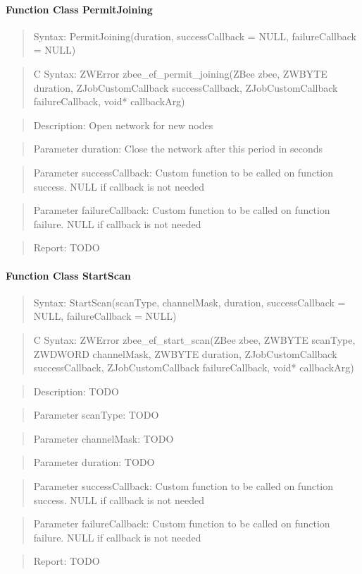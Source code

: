 \paragraph{Function Class PermitJoining}
\begin{quote}Syntax: PermitJoining(duration, successCallback = NULL, failureCallback = NULL)\end{quote}
\begin{quote}C Syntax: ZWError zbee\_ef\_permit\_joining(ZBee zbee, ZWBYTE duration, ZJobCustomCallback successCallback, ZJobCustomCallback failureCallback, void* callbackArg)\end{quote}
\begin{quote}Description: Open network for new nodes\end{quote}
\begin{quote}Parameter duration: Close the network after this period in seconds\end{quote}
\begin{quote}Parameter successCallback: Custom function to be called on function success. NULL if callback is not needed\end{quote}
\begin{quote}Parameter failureCallback: Custom function to be called on function failure. NULL if callback is not needed\end{quote}
\begin{quote}Report: TODO\end{quote}

\paragraph{Function Class StartScan}
\begin{quote}Syntax: StartScan(scanType, channelMask, duration, successCallback = NULL, failureCallback = NULL)\end{quote}
\begin{quote}C Syntax: ZWError zbee\_ef\_start\_scan(ZBee zbee, ZWBYTE scanType, ZWDWORD channelMask, ZWBYTE duration, ZJobCustomCallback successCallback, ZJobCustomCallback failureCallback, void* callbackArg)\end{quote}
\begin{quote}Description: TODO\end{quote}
\begin{quote}Parameter scanType: TODO\end{quote}
\begin{quote}Parameter channelMask: TODO\end{quote}
\begin{quote}Parameter duration: TODO\end{quote}
\begin{quote}Parameter successCallback: Custom function to be called on function success. NULL if callback is not needed\end{quote}
\begin{quote}Parameter failureCallback: Custom function to be called on function failure. NULL if callback is not needed\end{quote}
\begin{quote}Report: TODO\end{quote}

